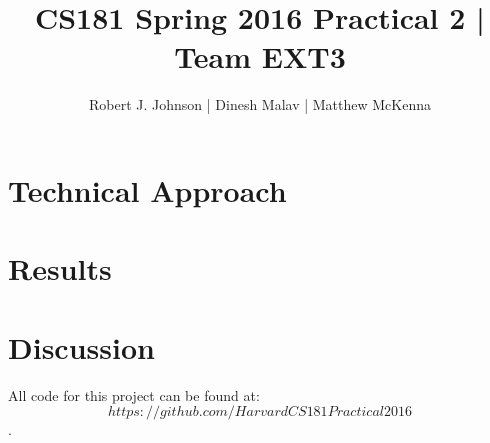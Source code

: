 \documentclass{article}
\begin{document}
\title{CS181 Spring 2016 Practical 2 | Team EXT3}
\author{Robert J. Johnson | Dinesh Malav | Matthew McKenna}



\maketitle

\begin{abstract}
 
\end{abstract}

\section{Technical Approach}

\section{Results}



\section{Discussion}
All code for this project can be found at: $$https://github.com/HarvardCS181Practical2016$$.
\end{document}
